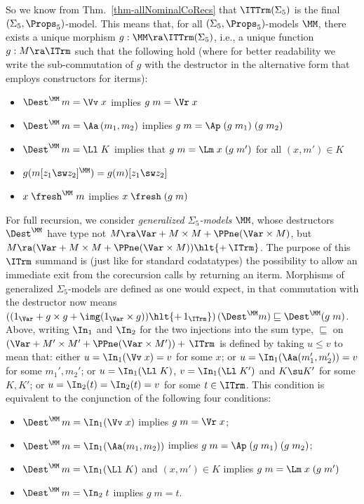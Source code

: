 So we know from Thm.~\ref{thm-allNominalCoRecs} that 
$\ITTrm(\Sigma_5)$ is the final $(\Sigma_5,\Props_5)$-model. This means that, 
for all $(\Sigma_5,\Props_5)$-models $\MM$, there exists a unique morphism $g : \MM \ra \ITTrm(\Sigma_5)$, i.e., a unique function $g : M \ra \ITrm$ such that the following hold (where for better readability we write the sub-commutation of $g$ with the destructor in the alternative form that employs constructors for iterms): 
%
\begin{itemize}
	\item[(1)] $\Dest^\MM\,m = \Vv\;x$ implies $g\;m = \Vr\;x$ 
	\item[(2)] $\Dest^\MM\,m = \Aa\,(m_1,m_2)$ implies $g\;m = \Ap\;(g\;m_1)\;(g\;m_2)$
	\item[(3)] $\Dest^\MM\,m = \Ll\;K$ implies that $g\;m = \Lm\;x\;(g\;m')$ for all $(x,m') \in K$
	\item[(4)] $g(m[z_1 \sw z_2]^\MM) = g(m)[z_1 \sw z_2]$
	\item[(5)] $x\;\fresh^\MM\;m$ implies $x\;\fresh\;(g\;m)$
\end{itemize}

For full recursion, we consider \emph{generalized $\Sigma_5$-models} $\MM$, whose destructors $\Dest^{\MM}$ have type not $M \ra \Var + M \times M + \PPne(\Var \times M)$, but 
$M \ra (\Var + M \times M + \PPne(\Var \times M)) \hlt{+\, \ITrm}$. The purpose of this $\ITrm$ summand is (just like for standard codatatypes) the possibility to allow an immediate exit from the corecursion calls by returning an iterm. 
Morphisms of generalized $\Sigma_5$-models are defined as one would expect, in that commutation with the destructor now means 
$((1_\Var + g \times g + \img(1_\Var \times g))\hlt{+\, 1_{\ITrm}})\,(\Dest^{\MM} m) \sqsubseteq  \Dest^{\MM}(g\;m)$. Above, writing $\In_1$ and $\In_2$ for the two injections into the sum type, $\sqsubseteq$ on $(\Var + M' \times M' + \PPne(\Var \times M')) +\, \ITrm$ 
is defined by taking $u \leq v$ to mean that: 
either $u=\In_1(\Vv\;x) = v$ for some $x$; 
or $u=\In_1(\Aa(m_1',m_2')) = v$ for some $m_1',m_2'$;
or $u=\In_1(\Ll\;K)$, $v = \In_1(\Ll\;K')$ and $K\su K'$ for some $K,K'$; 
or $u = \In_2(t) = \In_2(t) = v$ for some $t\in\ITrm$. 
%
%
%
This condition is equivalent to the conjunction of the following four conditions:  %
\begin{itemize}
	\item $\Dest^{\MM}\,m = \In_1(\Vv\;x)$ implies $g\;m = \Vr\;x$; 
	\item $\Dest^{\MM}\,m = \In_1(\Aa (m_1,m_2))$ implies $g\;m = \Ap\;(g\;m_1)\;(g\;m_2)$; 
	\item $\Dest^{\MM}\,m = \In_1(\Ll \;K)$ and $(x,m')\in K$ implies $g\;m = \Lm\;x\;(g\;m')$
	\item $\Dest^{\MM}\,m = \In_2\;t$ implies $g\;m = t$. 
\end{itemize}

